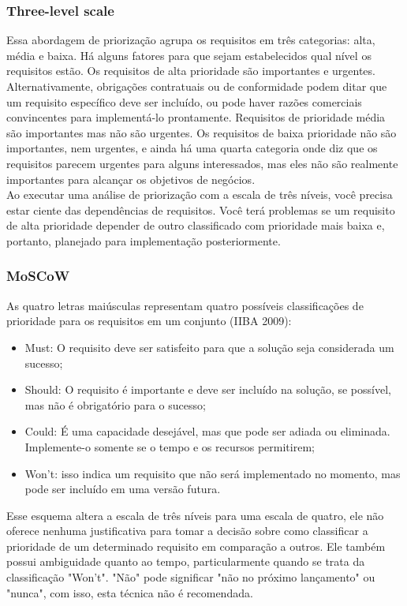 \documentclass[runningheads]{llncs}
\begin{document}
\subsubsection{Three-level scale}
Essa abordagem de priorização agrupa os requisitos em três categorias: alta, média e baixa. Há alguns fatores para que sejam estabelecidos qual nível os requisitos estão. Os requisitos de alta prioridade são importantes e urgentes. Alternativamente, obrigações contratuais ou de conformidade podem ditar que um requisito específico deve ser incluído, ou pode haver razões comerciais convincentes para implementá-lo prontamente. Requisitos de prioridade média são importantes mas não são urgentes. Os requisitos de baixa prioridade não são importantes, nem urgentes, e ainda há uma quarta categoria onde diz que os requisitos parecem urgentes para alguns interessados, mas eles não são realmente importantes para alcançar os objetivos de negócios.\\

Ao executar uma análise de priorização com a escala de três níveis, você precisa estar ciente das dependências de requisitos. Você terá problemas se um requisito de alta prioridade depender de outro classificado com prioridade mais baixa e, portanto, planejado para implementação posteriormente.

\subsubsection{MoSCoW}
As quatro letras maiúsculas representam quatro possíveis classificações de prioridade para os requisitos em um conjunto (IIBA 2009): 

\begin{itemize}
    \item Must: O requisito deve ser satisfeito para que a solução seja considerada um sucesso;
    \item Should: O requisito é importante e deve ser incluído na solução, se possível, mas não é obrigatório para o sucesso;
    \item Could: É uma capacidade desejável, mas que pode ser adiada ou eliminada. Implemente-o somente se o tempo e os recursos permitirem;
    \item Won't: isso indica um requisito que não será implementado no momento, mas pode ser incluído em uma versão futura. 
\end{itemize}

Esse esquema altera a escala de três níveis para uma escala de quatro, ele não oferece nenhuma justificativa para tomar a decisão sobre como classificar a prioridade de um determinado requisito em comparação a outros. Ele também possui ambiguidade quanto ao tempo, particularmente quando se trata da classificação "Won't". "Não" pode significar "não no próximo lançamento" ou "nunca", com isso, esta técnica não é recomendada.
\end{document}
